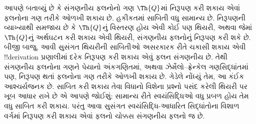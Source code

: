 \documentclass[../../../include/open-logic-section]{subfiles}
\begin{document}
\begin{explain}
આપણે બતાવ્યું છે કે સંગણનીય ફલનોનો ગણ
$\Th{Q}$માં નિરૂપણ કરી શકાય એવાં
ફલનોના ગણ તરીકે ઓળખી શકાય છે. હકીકતમાં
સાબિતી વધુ સામાન્ય છે. નિરૂપણની
વ્યાખ્યાથી સમજાય છે કે $\Th{Q}$નું વિસ્તરણ
હોય એવી કોઈ પણ થિયરી, અથવા જેમાં $\Th{Q}$નું
અર્થઘટન કરી શકાય એવી થિયરી, સંગણનીય
ફલનોનું નિરૂપણ કરી શકે છે. બીજી
બાજુ, આવી સુસંગત થિયરીની સાબિતીઓ અસરકારક રીતે
ચકાસી શકાય એવી !!{derivation} પ્રણાલીમાં દરેક
નિરૂપણ કરી શકાય એવું ફલન
સંગણનીય છે. તેથી સંગણનીય ફલનોના
ગણને પેયાનો અંકગણિતમાં, અથવા ઝેર્મેલો--ફ્રેન્કેલ
ગણસિદ્ધાંતમાં પણ, નિરૂપણ થતાં
ફલનોના ગણ તરીકે ઓળખી શકાય છે.
ગેડેલે નોંધ્યું તેમ, આ કંઈક આશ્ચર્યજનક છે.
સાબિત કરી શકાય તેવા વિધાનો વિશેના પ્રશ્નો
પસંદ કરેલી થિયરી પર ખૂબ આધાર રાખે છે
એ આપણે જોઈશું: સામાન્ય રીતે સ્વયંસિદ્ધિઓ
વધુ પ્રબળ હોય તેમ વધુ સાબિત કરી શકાય.
પરંતુ આવા સુસંગત સ્વયંસિદ્ધિ-આધારિત સિદ્ધાંતોના
વિશાળ વર્ગમાં નિરૂપણ કરી શકાય
એવાં ફલનો ચોક્કસ સંગણનીય ફલનો જ છે.
\end{explain}
\end{document}
